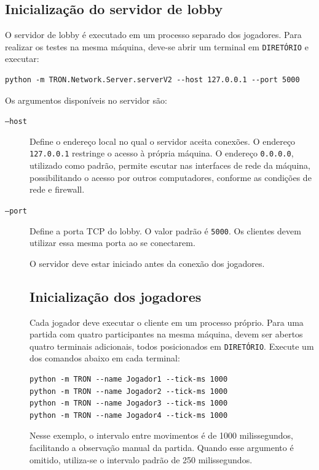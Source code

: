 \documentclass[11pt,a4paper]{article}
\begin{document}
\subsection{Inicialização do servidor de lobby}

O servidor de lobby é executado em um processo separado dos jogadores. Para realizar os testes na mesma máquina, deve-se abrir um terminal em \texttt{DIRETÓRIO} e executar:

\begin{verbatim}
python -m TRON.Network.Server.serverV2 --host 127.0.0.1 --port 5000
\end{verbatim}

Os argumentos disponíveis no servidor são:

\begin{description}
    \item[\texttt{--host}] Define o endereço local no qual o servidor aceita conexões. O endereço \texttt{127.0.0.1} restringe o acesso à própria máquina. O endereço \texttt{0.0.0.0}, utilizado como padrão, permite escutar nas interfaces de rede da máquina, possibilitando o acesso por outros computadores, conforme as condições de rede e firewall.

    \item[\texttt{--port}] Define a porta TCP do lobby. O valor padrão é \texttt{5000}. Os clientes devem utilizar essa mesma porta ao se conectarem.

O servidor deve estar iniciado antes da conexão dos jogadores.
\subsection{Inicialização dos jogadores}

Cada jogador deve executar o cliente em um processo próprio. Para uma partida com quatro participantes na mesma máquina, devem ser abertos quatro terminais adicionais, todos posicionados em \texttt{DIRETÓRIO}. Execute um dos comandos abaixo em cada terminal:

\begin{verbatim}
python -m TRON --name Jogador1 --tick-ms 1000
python -m TRON --name Jogador2 --tick-ms 1000
python -m TRON --name Jogador3 --tick-ms 1000
python -m TRON --name Jogador4 --tick-ms 1000
\end{verbatim}

Nesse exemplo, o intervalo entre movimentos é de 1000 milissegundos, facilitando a observação manual da partida. Quando esse argumento é omitido, utiliza-se o intervalo padrão de 250 milissegundos.


\end{description}
\end{document}
